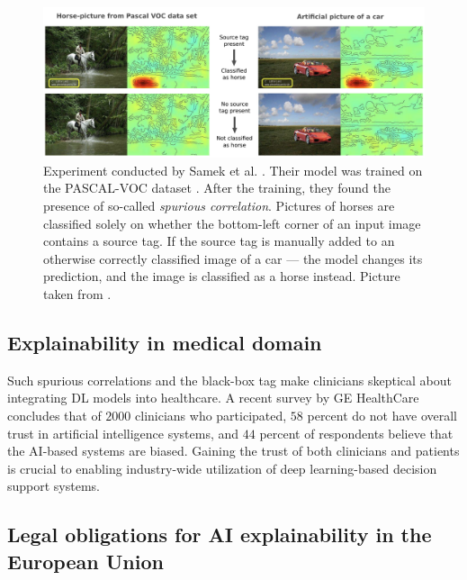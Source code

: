 \begin{figure}[!h]
    \begin{center}
    \begin{minipage}{1\textwidth}
      \includegraphics[width=\textwidth]{img/horse-tag.png}
    \end{minipage}
    \caption{Experiment conducted by Samek et al. \cite{xai-horse}. Their model was trained on the PASCAL-VOC dataset \cite{pascal-voc}. After the training, they found the presence of so-called \emph{spurious correlation}. Pictures of horses are classified solely on whether the bottom-left corner of an input image contains a source tag. If the source tag is manually added to an otherwise correctly classified image of a car --- the model changes its prediction, and the image is classified as a horse instead. Picture taken from \cite{xai-horse}.}
    \label{fig:horse-tag}
    \end{center}

\end{figure}

\subsection*{Explainability in medical domain}

Such spurious correlations and the black-box tag make clinicians skeptical about integrating DL models into healthcare.
A recent survey by GE HealthCare \cite{ge-healthcare-survey} concludes that of $2000$ clinicians who participated, $58$ percent do not have overall trust in artificial intelligence systems, and $44$ percent of respondents believe that the AI-based systems are biased.
Gaining the trust of both clinicians and patients is crucial to enabling industry-wide utilization of deep learning-based decision support systems.

\subsection*{Legal obligations for AI explainability in the European Union}

